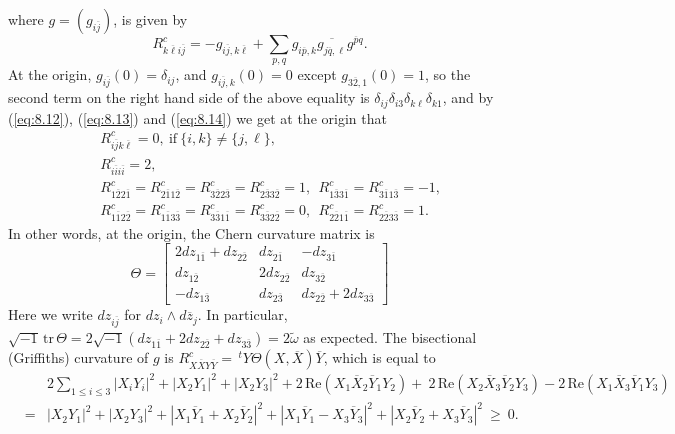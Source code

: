 \documentclass{amsart}
\numberwithin{equation}{section}
\theoremstyle{definition}
\renewcommand{\1}{\mathds{1}}
\renewcommand{\>}{\rightarrow}
\begin{document}
where $g=(g_{i\overline{j}})$, is given by
$$ R^c_{k\overline{\ell}i\overline{j}} = - g_{i\overline{j},k\overline{\ell}} + \sum_{p,q} g_{i\overline{p},k} \overline{ g_{j\overline{q},\ell}  } g^{\overline{p}q} .$$
At the origin, $g_{i\overline{j}} (0)=\delta_{ij}$, and $g_{i\overline{j},k} (0)=0$ except $g_{3\overline{2},1} (0)=1$, so the second term on the right hand side of the above equality is $\delta_{ij}\delta_{i3}\delta_{k\ell}\delta_{k1}$, and by (\ref{eq:8.12}), (\ref{eq:8.13}) and (\ref{eq:8.14}) we get at the origin that
\begin{eqnarray}
\label{eq:8.15} && R^c_{i\overline{j}k\overline{\ell}} = 0 , \ \mbox{if} \ \{i,k\} \neq \{ j,\ell\}, \\
\label{eq:8.16} && R^c_{i\overline{i}i\overline{i}} = 2, \\
\label{eq:8.17} && R^c_{1\overline{2}2\overline{1}} = R^c_{2\overline{1}1\overline{2}}
= R^c_{3\overline{2}2\overline{3}} = R^c_{2\overline{3}3\overline{2}} =1,
\ \ R^c_{1\overline{3}3\overline{1}} = R^c_{3\overline{1}1\overline{3}} =-1,\\
\label{eq:4.18} && R^c_{1\overline{1}2\overline{2}}  = R^c_{1\overline{1}3\overline{3}} =R^c_{3\overline{3}1\overline{1}}= R^c_{3\overline{3}2\overline{2}} =0, \ \ R^c_{2\overline{2}1\overline{1}} = R^c_{2\overline{2}3\overline{3}} =1.
\end{eqnarray}
In other words, at the origin, the Chern curvature matrix is
\begin{equation}
\Theta = \left[ \begin{array}{ccc}   2dz_{1\overline{1}}+dz_{2\overline{2}} & dz_{2\overline{1}} &  -dz_{3\overline{1}}  \\ dz_{1\overline{2}}  & 2 dz_{2\overline{2}}  & dz_{3\overline{2}}  \\
- dz_{1\overline{3}}  & dz_{2\overline{3}}  & dz_{2\overline{2}}+ 2dz_{3\overline{3}}  \end{array} \right]
\end{equation}
Here we write $dz_{i\overline{j}}$ for $dz_i\wedge d\overline{z}_j$. In particular, $\sqrt{-1} \,\mathrm{tr} \, \Theta = 2\sqrt{-1}(dz_{1\overline{1}}+2dz_{2\overline{2}}+dz_{3\overline{3}}) = 2\tilde{\omega}$ as expected. The bisectional (Griffiths) curvature of $g$ is $R^c_{X\overline{X}Y\overline{Y}} = \,^tY \Theta (X, \overline{X}) \overline{Y}$, which is equal  to
\begin{eqnarray*}
&&  2\sum_{1 \leq i \leq 3} |X_iY_i|^2 + |X_2Y_1|^2+|X_2Y_3|^2 + 2\,\mbox{Re} (X_1\overline{X}_2\overline{Y}_1Y_2)  + \ 2\,\mbox{Re} (X_2\overline{X}_3\overline{Y}_2Y_3) - 2\,\mbox{Re} (X_1\overline{X}_3\overline{Y}_1Y_3) \\
& = & |X_2Y_1|^2+|X_2Y_3|^2 + |X_1\overline{Y}_1 + X_2\overline{Y}_2|^2 + |X_1\overline{Y}_1 - X_3\overline{Y}_3|^2 + |X_2\overline{Y}_2 + X_3\overline{Y}_3|^2 \ \geq \ 0.
\end{eqnarray*}
\end{document}

